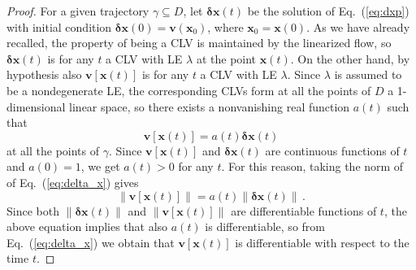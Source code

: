 \documentclass{article}
\theoremstyle{plain}
\theoremstyle{definition}
\theoremstyle{remark}
\newcommand{\vect}[1]{\boldsymbol{#1}}
\begin{document}
\begin{proof}
  For a given trajectory $\gamma\subseteq D$, let $\vect{\delta x}(t)$
  be the solution of Eq.~(\ref{eq:dxp}) with initial condition
  $\vect{\delta x}(0)=\vect{v}(\vect{x}_0)$, where
  $\vect{x}_0=\vect{x}(0)$.  As we have already recalled, the property
  of being a CLV is maintained by the linearized flow, so
  $\vect{\delta x}(t)$ is for any $t$ a CLV with LE $\lambda$ at the
  point $\vect{x}(t)$.  On the other hand, by hypothesis also
  $\vect{v}\left[\vect{x}(t)\right]$ is for any $t$ a CLV with LE
  $\lambda$.  Since $\lambda$ is assumed to be a nondegenerate LE, the
  corresponding CLVs form at all the points of $D$ a 1-dimensional
  linear space, so there exists a nonvanishing real function $a(t)$
  such that
  \begin{equation}\label{eq:delta_x}
\vect{v}\left[\vect{x}(t)\right]=   a(t) \vect{\delta x}(t)
  \end{equation}
  at all the points of $\gamma$. Since $\vect{v}\left[\vect{x}(t)\right]$ and
    $\vect{\delta x}(t)$ are continuous 
  functions of $t$ and  $a(0)=1$, we get $a(t)>0$ for any $t$.
  For this reason, taking the norm of of Eq.~(\ref{eq:delta_x}) gives
  \begin{equation}\label{eq:delta_xn}
  \lVert \vect{v}\left[\vect{x}(t)\right] \rVert  
    =
    a(t) \lVert \vect{\delta x}(t) \rVert
 \, .
  \end{equation}
  Since both $\lVert \vect{\delta x}(t) \rVert$ and $\lVert
  \vect{v}\left[\vect{x}(t)\right] \rVert$ are differentiable
  functions of $t$, the above equation implies that also $a(t)$ is differentiable,
so from Eq.~(\ref{eq:delta_x}) we obtain that  $\vect{v}\left[\vect{x}(t)\right]$ 
is differentiable with respect to  the time $t$.


\end{proof}
\end{document}
